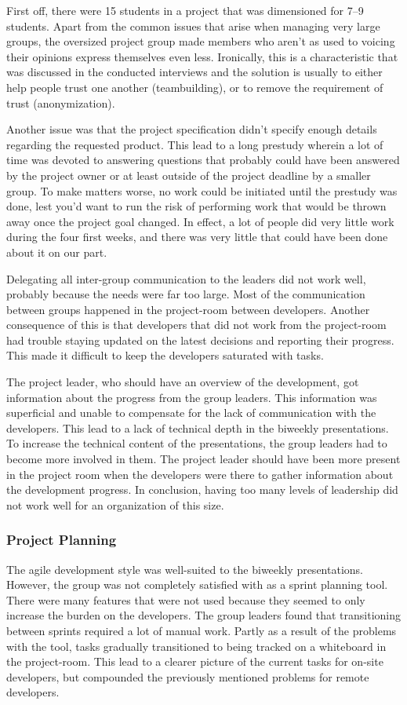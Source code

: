 First off, there were 15 students in a project that was dimensioned for 7--9 students. Apart from the common issues that arise when managing very large groups, the oversized project group made members who aren't as used to voicing their opinions express themselves even less. Ironically, this is a characteristic that was discussed in the conducted interviews and the solution is usually to either help people trust one another (teambuilding), or to remove the requirement of trust (anonymization). 

Another issue was that the project specification didn't specify enough details regarding the requested product. This lead to a long prestudy wherein a lot of time was devoted to answering questions that probably could have been answered by the project owner or at least outside of the project deadline by a smaller group. To make matters worse, no work could be initiated until the prestudy was done, lest you'd want to run the risk of performing work that would be thrown away once the project goal changed. In effect, a lot of people did very little work during the four first weeks, and there was very little that could have been done about it on our part.

Delegating all inter-group communication to the leaders did not work well, probably because the needs were far too large. Most of the communication between groups happened in the project-room between developers. Another consequence of this is that developers that did not work from the project-room had trouble staying updated on the latest decisions and reporting their progress. This made it difficult to keep the developers saturated with tasks.

The project leader, who should have an overview of the development, got information about the progress from the group leaders. This information was superficial and unable to compensate for the lack of communication with the developers. This lead to a lack of technical depth in the biweekly presentations. To increase the technical content of the presentations, the group leaders had to become more involved in them. The project leader should have been more present in the project room when the developers were there to gather information about the development progress. In conclusion, having too many levels of leadership did not work well for an organization of this size.

\subsubsection{Project Planning}
The agile development style was well-suited to the biweekly presentations. However, the group was not completely satisfied with \taiga{} as a sprint planning tool. There were many features that were not used because they seemed to only increase the burden on the developers. The group leaders found that transitioning between sprints required a lot of manual work. Partly as a result of the problems with the tool, tasks gradually transitioned to being tracked on a whiteboard in the project-room. This lead to a clearer picture of the current tasks for on-site developers, but compounded the previously mentioned problems for remote developers.
